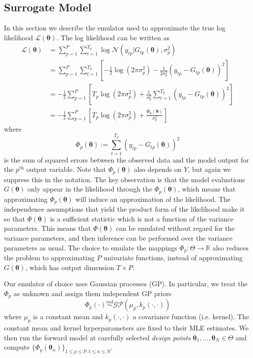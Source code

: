 \documentclass[12pt]{article}
\newcommand{\R}{\mathbb{R}}
\newcommand{\btheta}{\boldsymbol{\theta}}
\begin{document}
\subsection{Surrogate Model}
In this section we describe the emulator used to approximate the true log likelihood $\mathcal{L}(\btheta)$. The log likelihood can be written as 
\begin{align*}
\mathcal{L}(\btheta) &= \sum_{p = 1}^{P} \sum_{t = 1}^{T_p} \log \mathcal{N}\left(y_{tp}| G_{tp}(\btheta), \sigma_p^2 \right) \\
			       &= \sum_{p = 1}^{P}  \sum_{t = 1}^{T_p} \left[-\frac{1}{2} \log(2\pi \sigma_p^2) - \frac{1}{2\sigma_p^2} (y_{tp} - G_{tp}(\btheta))^2\right]  \\
			       &= -\frac{1}{2} \sum_{p = 1}^{P} \left[T_p \log\left(2\pi \sigma_p^2 \right) + \frac{1}{\sigma_p^2}\sum_{t = 1}^{T_p} \left(y_{tp} - G_{tp}(\btheta)\right)^2  \right] \\
			       &= -\frac{1}{2} \sum_{p = 1}^{P} \left[T_p \log\left(2\pi \sigma_p^2 \right) + \frac{\Phi_p(\btheta)}{\sigma_p^2} \right] 
\end{align*}
where 
\[\Phi_p(\btheta) := \sum_{t = 1}^{T_p} (y_{tp} - G_{tp}(\btheta))^2\]
is the sum of squared errors between the observed data and the model output for the $p^{\text{th}}$ output variable. Note that $\Phi_p(\btheta)$ also depends on $Y$, but again we suppress this in the notation. The key observation 
is that the model evaluations $G(\btheta)$ only appear in the likelihood through the $\Phi_p(\btheta)$, which means that approximating $\Phi_p(\btheta)$ will induce an approximation of the likelihood. The independence assumptions 
that yield the product form of the likelihood make it so that $\Phi(\btheta)$ is a sufficient statistic which is not a function of the variance parameters. This means that $\Phi(\btheta)$ can be emulated without regard for the variance parameters, 
and then inference can be performed over the variance parameters as usual. The choice to emulate the mappings $\Phi_p: \Theta \to \R$ also reduces the problem to 
approximating $P$ univariate functions, instead of approximating $G(\btheta)$, which has output dimension $T \times P$. 

Our emulator of choice uses Gaussian processes (GP). In particular, we treat the $\Phi_p$ as unknown and assign them independent GP priors
\[\Phi_p(\cdot) \overset{ind}{\sim} \mathcal{GP}(\mu_p, k_p(\cdot, \cdot))\] 
where $\mu_p$ is a constant mean and $k_p(\cdot, \cdot)$ a covariance function (i.e. kernel). The constant mean and kernel hyperparameters are fixed to their MLE estimates. We then run the forward model at carefully selected 
\textit{design points} $\btheta_1, \dots, \btheta_N \in \Theta$ and compute $\{\Phi_p(\btheta_n)\}_{1 \leq p \leq P, 1 \leq n \leq N}$. 
\end{document}
